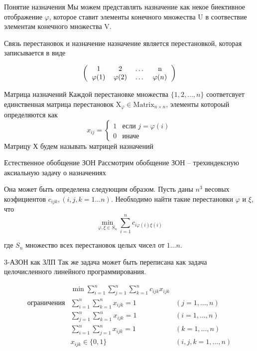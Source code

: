 \documentclass[12pt]{beamer}
\begin{document}
\begin{frame}{Понятие назначения}
Мы можем
представлять назначение как некое биективное отображение $\varphi$, которое ставит
элементы конечного множества $\mathrm{U}$ в соотвествие элементам конечного
множества $\mathrm{V}$.
\end{frame}



\begin{frame}{Связь перестановок и назначение}
назначение является перестановкой, которая записывается
в виде

\[
\left (
  \begin{tabular}{cccc}
  1 & 2 & \ldots & n\\
  $\varphi (1)$ & $\varphi (2)$ & \ldots & $\varphi (n)$
  \end{tabular}
\right )
\]
\end{frame}



\begin{frame}{Матрица назначений}
Каждой перестановке множества $\{1, 2, \ldots , n \}$ соответсвует единственная матрица
перестановок $\mathrm{X}_\varphi \in \mathrm{Matrix}_{n \times n}$, элементы котороый определяются как
\[
x_{ij} =
 \begin{cases}
   1 & \text{если } j = \varphi(i) \\
   0 & \text{иначе}
 \end{cases}
\]
Матрицу Х будем называть матрицей назначений
\end{frame}

\begin{frame}{Естественное обобщение ЗОН}
Рассмотрим обобщение ЗОН -- трехиндексную аксиальную задачу о назначениях

Она может быть определена следующим образом. 
Пусть даны $n^3$ весовых коэфициентов $c_{ijk}, (i,j,k=1 \ldots n)$. 
Необходимо найти такие перестановки $\varphi$ и $\xi$, что 
\[
  \min_{\varphi, \xi \in S_n} \sum^n_{i = 1} c_{i \varphi (i) \xi(i)}
\]

где $S_n$ множество всех перестановок целых чисел от $1 \ldots n$.
\end{frame}

\begin{frame}{3-АЗОН как ЗЛП}
Так же задача может быть переписана как задача целочисленного линейного программирования. 

\begin{eqnarray*}
  & \min \displaystyle \sum^n_{i = 1} \displaystyle \sum^n_{j = 1} \displaystyle \sum^n_{k = 1}
  c_{ijk} x_{ijk} \\
  \text{ограничения}
  &\displaystyle \sum^n_{i = 1} \displaystyle \sum^n_{k = 1} x_{ijk} = 1  &(j = 1, \ldots, n) \\
  &\displaystyle \sum^n_{j = 1} \displaystyle \sum^n_{k = 1} x_{ijk} = 1  &(i = 1, \ldots, n) \\
  &\displaystyle \sum^n_{i = 1} \displaystyle \sum^n_{j = 1} x_{ijk} = 1  &(k = 1, \ldots, n) \\
  & x_{ijk} \in \{ 0, 1 \} &(i,j,k = 1, \ldots, n)
\end{eqnarray*}
\end{frame}
\end{document}
